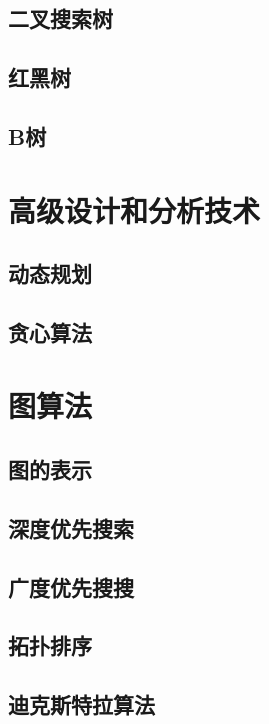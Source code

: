 \documentclass[oneside,10pt,fontset=none]{ctexbook}
\numberwithin{definition}{chapter}
\numberwithin{theorem}{chapter}
\numberwithin{proof}{chapter}
\begin{document}
\chapter{二叉搜索树}

\chapter{红黑树}

\chapter{B树}

\part{高级设计和分析技术}

\chapter{动态规划}

\chapter{贪心算法}

\part{图算法}

\chapter{图的表示}

\chapter{深度优先搜索}

\chapter{广度优先搜搜}

\chapter{拓扑排序}

\chapter{迪克斯特拉算法}
\end{document}
